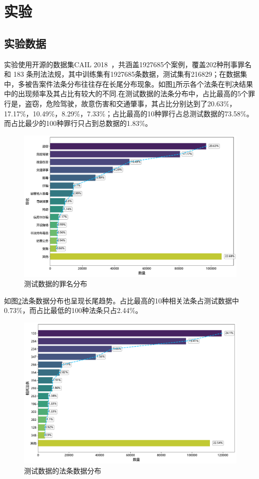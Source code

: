 \section{\heiti 实验}

\subsection{\heiti 实验数据}

实验使用开源的数据集CAIL 2018~\cite{xiao2018cail2018largescalelegaldataset}，共涵盖1927685个案例，覆盖202种刑事罪名和 183 条刑法法规，其中训练集有1927685条数据，测试集有216829；在数据集中，多被告案件法条分布往往存在长尾分布现象。如图\ref{fig:acc_dis}所示各个法条在判决结果中的出现频率及其占比有较大的不同.在测试数据的法条分布中，占比最高的5个罪行是，盗窃，危险驾驶，故意伤害和交通肇事，其占比分别达到了20.63\%，17.17\%，10.49\%，8.29\%，7.33\%；占比最高的10种罪行占总测试数据的73.58\%。而占比最少的100种罪行只占到总数据的1.83\%。
\begin{figure}[H]
		\centering
		\includegraphics[width=1\linewidth]{fig/accusation_distribution.pdf}
		\caption{测试数据的罪名分布}
		\label{fig:acc_dis}
\end{figure}
如图\ref{fig:art_dis}法条数据分布也呈现长尾趋势。占比最高的10种相关法条占测试数据中0.73\%，而占比最低的100种法条只占2.44\%。
\begin{figure}[H]
    \centering
    \includegraphics[width=1\linewidth]{fig/article_distribution.pdf}
    \caption{测试数据的法条数据分布}
    \label{fig:art_dis}
\end{figure}
